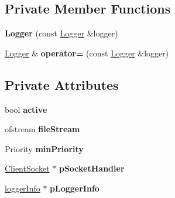 \subsection*{Private Member Functions}
\begin{DoxyCompactItemize}
\item 
\hypertarget{classLogger_a2c5d5039e76ef20903ce7cfbc8030d47}{{\bfseries Logger} (const \hyperlink{classLogger}{Logger} \&logger)}\label{classLogger_a2c5d5039e76ef20903ce7cfbc8030d47}

\item 
\hypertarget{classLogger_a400dd030dcec25d075f87202e880c5b9}{\hyperlink{classLogger}{Logger} \& {\bfseries operator=} (const \hyperlink{classLogger}{Logger} \&logger)}\label{classLogger_a400dd030dcec25d075f87202e880c5b9}

\end{DoxyCompactItemize}
\subsection*{Private Attributes}
\begin{DoxyCompactItemize}
\item 
\hypertarget{classLogger_a79d231b8f8c27d0c0b6f963f753b2be1}{bool {\bfseries active}}\label{classLogger_a79d231b8f8c27d0c0b6f963f753b2be1}

\item 
\hypertarget{classLogger_afea7dca3fd4d8f909bb5d5906d2b5293}{ofstream {\bfseries file\-Stream}}\label{classLogger_afea7dca3fd4d8f909bb5d5906d2b5293}

\item 
\hypertarget{classLogger_a2d408b566a4a54aafb391ca9ed3ffa03}{Priority {\bfseries min\-Priority}}\label{classLogger_a2d408b566a4a54aafb391ca9ed3ffa03}

\item 
\hypertarget{classLogger_a1a3d4ce692f3d78cc4f62dec79cb1685}{\hyperlink{classClientSocket}{Client\-Socket} $\ast$ {\bfseries p\-Socket\-Handler}}\label{classLogger_a1a3d4ce692f3d78cc4f62dec79cb1685}

\item 
\hypertarget{classLogger_a4a6cbed1d68b500ccd2bf6f8af486e88}{\hyperlink{structloggerInfo}{logger\-Info} $\ast$ {\bfseries p\-Logger\-Info}}\label{classLogger_a4a6cbed1d68b500ccd2bf6f8af486e88}

\end{DoxyCompactItemize}
